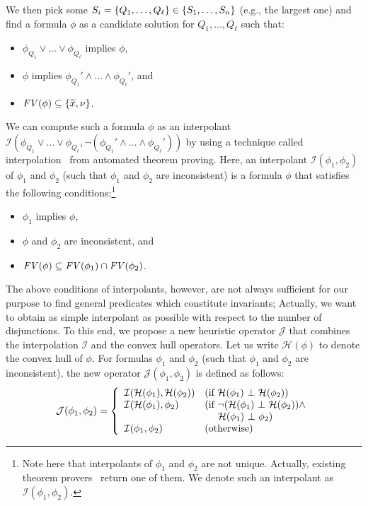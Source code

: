 We then pick some \(S_i = \{{Q_1,\dots,Q_{\ell}}\} \in 
\{{S_1,\dots,S_n}\}\) (e.g., the largest one) and find a formula \(\phi\) 
as a candidate solution for \(Q_1,\dots,Q_{\ell}\) such that:
\begin{itemize}
\item \(\phi_{Q_1} \lor \dots \lor \phi_{Q_{\ell}}\) implies \(\phi\),
\item \(\phi\) implies \(\phi_{Q_1}' \land \dots \land \phi_{Q_{\ell}}'\), and
\item \(\mathit{FV}({\phi}) \subseteq \{{\widetilde{x},\nu}\}\).
\end{itemize}
We can compute such a formula \(\phi\) as an interpolant 
\(\mathcal{I}(\phi_{Q_1} \lor \dots \lor \phi_{Q_{\ell}},\neg 
(\phi_{Q_1}' \land \dots \land \phi_{Q_{\ell}}'))\) by using a technique 
called interpolation~\cite{Henzinger2004,McMillan2005} from automated 
theorem proving.  Here, an interpolant \(\mathcal{I}(\phi_1,\phi_2)\) of 
\(\phi_1\) and \(\phi_2\) (such that \(\phi_1\) and \(\phi_2\) are 
inconsistent) is a formula \(\phi\) that satisfies the following 
conditions:\footnote{Note here that interpolants of \(\phi_1\) and 
\(\phi_2\) are not unique.  Actually, existing theorem 
provers~\cite{Henzinger2004,McMillan2005,Beyer2008} return one of them.  
We denote such an interpolant as \(\mathcal{I}(\phi_1,\phi_2)\).}
\begin{itemize}
\item \(\phi_1\) implies \(\phi\),
\item \(\phi\) and \(\phi_2\) are inconsistent, and
\item \(\mathit{FV}({\phi}) \subseteq \mathit{FV}({\phi_1}) \cap \mathit{FV}({\phi_2})\).
\end{itemize}
The above conditions of interpolants, however, are not always sufficient 
for our purpose to find general predicates which constitute invariants;  
Actually, we want to obtain as simple interpolant as possible with 
respect to the number of disjunctions.
To this end, we propose a new heuristic operator \(\mathcal{J}\) that 
combines the interpolation \(\mathcal{I}\) and the convex hull operators. 
 Let us write \(\mathcal{H}(\phi)\) to denote the convex hull of \(\phi\). 
 For formulas \(\phi_1\) and \(\phi_2\) (such that \(\phi_1\) and 
\(\phi_2\) are inconsistent), the new operator 
\(\mathcal{J}(\phi_1,\phi_2)\) is defined as follows:
\begin{eqnarray*}
\mathcal{J}(\phi_1,\phi_2) =
\left\{
\begin{array}{ll}
\mathcal{I}(\mathcal{H}(\phi_1),\mathcal{H}(\phi_2)) & (\mbox{if~}\mathcal{H}(\phi_1) \ \bot\  \mathcal{H}(\phi_2)) \\
\mathcal{I}(\mathcal{H}(\phi_1),\phi_2) & (\mbox{if~}\neg (\mathcal{H}(\phi_1) \ \bot\  \mathcal{H}(\phi_2)) \land \\
&\ \quad \mathcal{H}(\phi_1) \ \bot\  \phi_2) \\
\mathcal{I}(\phi_1,\phi_2) & (\mbox{otherwise})
\end{array}
\right.
\end{eqnarray*}
